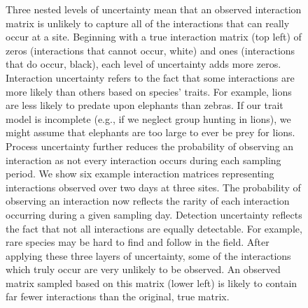\documentclass[12pt]{article}
\begin{document}

  \begin{figure}[h!]
    \caption{Three nested levels of uncertainty mean that an observed interaction matrix is unlikely to capture all of the interactions that can really occur at a site. Beginning with a true interaction matrix (top left) of zeros (interactions that cannot occur, white) and ones (interactions that do occur, black), each level of uncertainty adds more zeros. Interaction uncertainty refers to the fact that some interactions are more likely than others based on species' traits. For example, lions are less likely to predate upon elephants than zebras. If our trait model is incomplete (e.g., if we neglect group hunting in lions), we might assume that elephants are too large to ever be prey for lions. Process uncertainty further reduces the probability of observing an interaction as not every interaction occurs during each sampling period. We show six example interaction matrices representing interactions observed over two days at three sites. The probability of observing an interaction now reflects the rarity of each interaction occurring during a given sampling day. Detection uncertainty reflects the fact that not all interactions are equally detectable. For example, rare species may be hard to find and follow in the field. After applying these three layers of uncertainty, some of the interactions which truly occur are very unlikely to be observed. An observed matrix sampled based on this matrix (lower left) is likely to contain far fewer interactions than the original, true matrix.}
    \label{conceptual_fig}
    \begin{center}

\end{center}
\end{figure}
\end{document}
